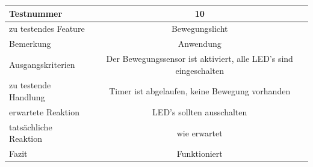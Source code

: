 \documentclass[]{article}
\begin{document}
\begin{longtable}[]{@{}lc@{}}
\toprule
\begin{minipage}[b]{0.25\columnwidth}\raggedright\strut
Testnummer\strut
\end{minipage} & \begin{minipage}[b]{0.55\columnwidth}\centering\strut
10\strut
\end{minipage}\tabularnewline
\midrule
\endhead
\begin{minipage}[t]{0.25\columnwidth}\raggedright\strut
zu testendes Feature\strut
\end{minipage} & \begin{minipage}[t]{0.55\columnwidth}\centering\strut
Bewegungslicht\strut
\end{minipage}\tabularnewline
\begin{minipage}[t]{0.25\columnwidth}\raggedright\strut
Bemerkung\strut
\end{minipage} & \begin{minipage}[t]{0.55\columnwidth}\centering\strut
Anwendung\strut
\end{minipage}\tabularnewline
\begin{minipage}[t]{0.25\columnwidth}\raggedright\strut
Ausgangskriterien\strut
\end{minipage} & \begin{minipage}[t]{0.55\columnwidth}\centering\strut
Der Bewegungssensor ist aktiviert, alle LED's sind eingeschalten\strut
\end{minipage}\tabularnewline
\begin{minipage}[t]{0.25\columnwidth}\raggedright\strut
zu testende Handlung\strut
\end{minipage} & \begin{minipage}[t]{0.55\columnwidth}\centering\strut
Timer ist abgelaufen, keine Bewegung vorhanden\strut
\end{minipage}\tabularnewline
\begin{minipage}[t]{0.25\columnwidth}\raggedright\strut
erwartete Reaktion\strut
\end{minipage} & \begin{minipage}[t]{0.55\columnwidth}\centering\strut
LED's sollten ausschalten\strut
\end{minipage}\tabularnewline
\begin{minipage}[t]{0.25\columnwidth}\raggedright\strut
tatsächliche Reaktion\strut
\end{minipage} & \begin{minipage}[t]{0.55\columnwidth}\centering\strut
wie erwartet\strut
\end{minipage}\tabularnewline
\begin{minipage}[t]{0.25\columnwidth}\raggedright\strut
Fazit\strut
\end{minipage} & \begin{minipage}[t]{0.55\columnwidth}\centering\strut
Funktioniert\strut
\end{minipage}\tabularnewline
\bottomrule
\end{longtable}
\end{document}
